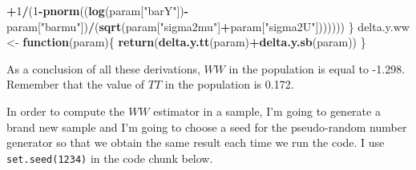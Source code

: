\documentclass[]{book}
\newenvironment{Shaded}{\begin{snugshade}}{\end{snugshade}}
\newcommand{\KeywordTok}[1]{\textcolor[rgb]{0.13,0.29,0.53}{\textbf{#1}}}
\newcommand{\DecValTok}[1]{\textcolor[rgb]{0.00,0.00,0.81}{#1}}
\newcommand{\StringTok}[1]{\textcolor[rgb]{0.31,0.60,0.02}{#1}}
\newcommand{\ControlFlowTok}[1]{\textcolor[rgb]{0.13,0.29,0.53}{\textbf{#1}}}
\newcommand{\OperatorTok}[1]{\textcolor[rgb]{0.81,0.36,0.00}{\textbf{#1}}}
\newcommand{\NormalTok}[1]{#1}
\theoremstyle{definition}
\theoremstyle{definition}
\theoremstyle{definition}
\theoremstyle{remark}
\begin{document}
\begin{Shaded}
\begin{Highlighting}[]
           \OperatorTok{+}\DecValTok{1}\OperatorTok{/}\NormalTok{(}\DecValTok{1}\OperatorTok{-}\KeywordTok{pnorm}\NormalTok{((}\KeywordTok{log}\NormalTok{(param[}\StringTok{"barY"}\NormalTok{])}\OperatorTok{-}\NormalTok{param[}\StringTok{"barmu"}\NormalTok{])}\OperatorTok{/}\NormalTok{(}\KeywordTok{sqrt}\NormalTok{(param[}\StringTok{"sigma2mu"}\NormalTok{]}\OperatorTok{+}\NormalTok{param[}\StringTok{"sigma2U"}\NormalTok{]))))))}
\NormalTok{\}}
\NormalTok{delta.y.ww <-}\StringTok{ }\ControlFlowTok{function}\NormalTok{(param)\{}
  \KeywordTok{return}\NormalTok{(}\KeywordTok{delta.y.tt}\NormalTok{(param)}\OperatorTok{+}\KeywordTok{delta.y.sb}\NormalTok{(param))}
\NormalTok{\}}
\end{Highlighting}
\end{Shaded}

As a conclusion of all these derivations, \(WW\) in the population is
equal to -1.298. Remember that the value of \(TT\) in the population is
0.172.

In order to compute the \(WW\) estimator in a sample, I'm going to
generate a brand new sample and I'm going to choose a seed for the
pseudo-random number generator so that we obtain the same result each
time we run the code. I use \texttt{set.seed(1234)} in the code chunk
below.
\end{document}
